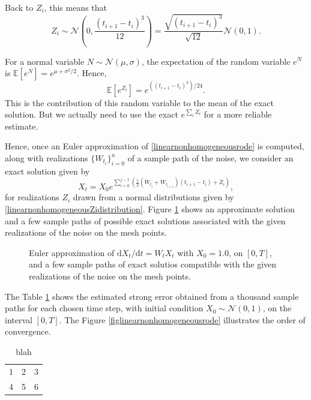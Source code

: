 \documentclass[reqno,12pt]{amsart}
\theoremstyle{plain}%
\theoremstyle{definition}
\begin{document}
Back to $Z_i$, this means that
\begin{equation}
    \label{linearnonhomogeneousZidistribution}
    Z_i \sim \mathcal{N}\left(0, \frac{(t_{i+1}- t_i)^3}{12}\right) = \frac{\sqrt{(t_{i+1} - t_i)^3}}{\sqrt{12}}\mathcal{N}(0, 1).
\end{equation}

For a normal variable $N \sim \mathcal{N}(\mu, \sigma)$, the expectation of the random variable $e^N$ is $\mathbb{E}[e^N] = e^{\mu + \sigma^2/2}$. Hence,
\begin{equation}
    \mathbb{E}[e^{Z_i}] = e^{((t_{i+1}- t_i)^3)/24}.
\end{equation}
This is the contribution of this random variable to the mean of the exact solution. But we actually need to use the exact $e^{\sum_i Z_i}$ for a more reliable estimate.

Hence, once an Euler approximation of \eqref{linearnonhomogeneousrode} is computed, along with realizations $\{W_{t_i}\}_{i=0}^n$ of a sample path of the noise, we consider an exact solution given by
\begin{equation}
    \label{Xtlinearnonhomogeneousrode}
    X_t = X_0 e^{\sum_{i = 0}^{j-1}\left(\frac{1}{2}\left(W_{t_i} + W_{t_{i+1}}\right)(t_{i+1} - t_i) + Z_i\right)},
\end{equation}
for realizations $Z_i$ drawn from a normal distributions given by \eqref{linearnonhomogeneousZidistribution}. Figure \ref{samplepathslinearnonhomogeneousrode} shows an approximate solution and a few sample paths of possible exact solutions associated with the given realizations of the noise on the mesh points.
\begin{figure}
    \label{samplepathslinearnonhomogeneousrode}
    \caption{Euler approximation of $\mathrm{d}X_t/\mathrm{d}t = W_t X_t$ with $X_0 = 1.0$, on $[0, T]$, and a few sample paths of exact solutios compatible with the given realizations of the noise on the mesh points.}
\end{figure}

The Table \ref{tablinearnonhomogeneousrode} shows the estimated strong error obtained from a thousand sample paths for each chosen time step, with initial condition $X_0 \sim \mathcal{N}(0, 1)$, on the interval $[0, T]$. The Figure \ref{figlinearnonhomogeneousrode} illustrates the order of convergence.

\begin{table}
    \label{tablinearnonhomogeneousrode}
    \begin{tabular}[htb]{l|l|l}
        1 & 2 & 3 \\
        4 & 5 & 6
    \end{tabular}
    \caption{blah}
\end{table}
\end{document}
